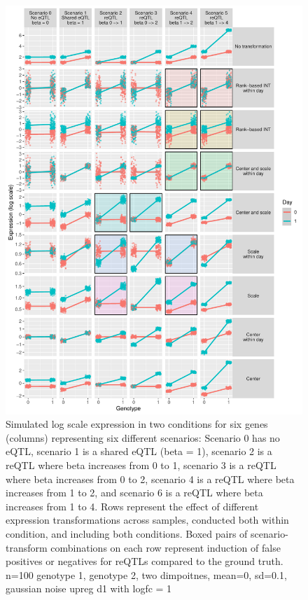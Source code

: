 \begin{figure}
    \centering
    \includegraphics[width=1.0\textwidth,page=1]{mainmatter/figures/chapter_03/simulate_expression_transforms.pdf}
    \caption{
        Simulated log scale expression in two conditions for six genes (columns) representing six different scenarios:
            Scenario 0 has no \gls{eQTL}, 
            scenario 1 is a shared eQTL (beta = 1), 
            scenario 2 is a \gls{reQTL} where beta increases from 0 to 1,
            scenario 3 is a \gls{reQTL} where beta increases from 0 to 2,
            scenario 4 is a \gls{reQTL} where beta increases from 1 to 2,
            and scenario 6 is a \gls{reQTL} where beta increases from 1 to 4.
            Rows represent the effect of different expression transformations across samples, conducted both within condition, and including both conditions.
            Boxed pairs of scenario-transform combinations on each row represent induction of false positives or negatives for reQTLs compared to the ground truth.
            n=100 genotype 1, genotype 2, two dimpoitnes, mean=0, sd=0.1, gaussian noise
            upreg d1 with logfc = 1
    }
    \label{fig:hird_eQTL_expressionTransform_sims}
\end{figure}


